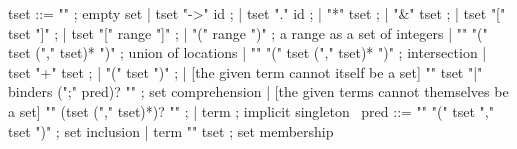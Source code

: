 \begin{syntax}
  tset ::= "\empty" ; empty set
       | tset "->" id ;
       | tset "." id ;
       | "*" tset ;
       | "&" tset ;
       | tset "[" tset "]" ;
       | tset "[" range "]" ;
       | "(" range ")" ; a range as a set of integers
       | "\union" "(" tset ("," tset)* ")" ; union of locations
       | "\inter" "(" tset ("," tset)* ")" ; intersection
       | tset "+" tset ;
       | "(" tset ")" ;
       | {[the given term cannot itself be a set]
           "{" tset "|" binders (";" pred)? "}"} ; set comprehension
       | {[the given terms cannot themselves be a set] 
          "{" (tset ("," tset)*)? "}" };
       | term ; implicit singleton
       \
  pred ::= "\subset" "(" tset "," tset ")" ; set inclusion
       | term "\in" tset ; set membership
\end{syntax}

